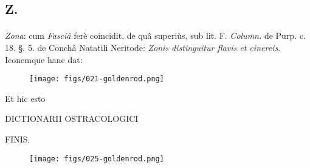 \documentclass[a4paper, 11pt, oneside, polutonikogreek, german]{article}
\begin{document}
\subsection{Z.}
\paragraph{}
\emph{Zona}: cum \emph{Fasciâ} ferè coincidit, de quâ superiùs, sub lit. F. \emph{Column.} de Purp. c. 18. §. 5. de Conchâ Natatili Neritode: \emph{Zonis distinguitur flavis et cinereis}. Iconemque hanc dat:

\begin{figure}[H]
\centering
\texttt{[image: figs/021-goldenrod.png]}
\end{figure}
\begin{center}
Et hic esto

DICTIONARII OSTRACOLOGICI

FINIS.
\end{center}
\begin{figure}[H]
\centering
\texttt{[image: figs/025-goldenrod.png]}
\end{figure}
\clearpage
\end{document}
